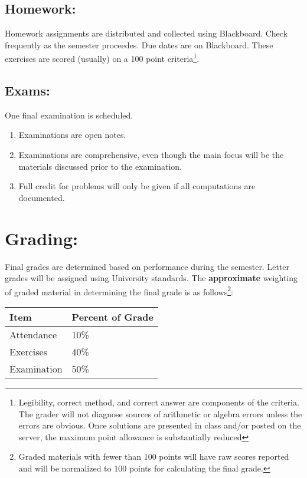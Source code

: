 \documentclass[12pt]{article}
\begin{document}
\subsection*{Homework:} 
Homework assignments are distributed and collected using Blackboard.  Check frequently as the semester proceedes.  Due dates are on Blackboard.  
These exercises are scored (usually) on a 100 point criteria\footnote{Legibility, correct method, and correct answer are components of the criteria.   
The grader will not diagnose sources of arithmetic or algebra errors unless the errors are obvious.  
Once solutions are presented in class and/or posted on the server, the maximum point allowance is substantially reduced}.


\subsection*{Exams:} One final examination is scheduled.  
\begin{enumerate}
\item Examinations are open notes.
\item Examinations are comprehensive, even though the main focus will be the materials discussed prior to the examination.
\item Full credit for problems will only be given if all computations are documented.
\end{enumerate}

\section*{Grading:} Final grades are determined based on performance during the semester.  Letter grades will be assigned using University standards.  The \textbf{approximate} weighting of graded material in determining the final grade is as follows\footnote{Graded materials with fewer than 100 points will have raw scores reported and will be normalized to 100 points for calculating the final grade.}:
\begin{table}[h!]
   \centering
   \begin{tabular}{l l}
Item & Percent of Grade \\
\hline
\hline
Attendance & 10\% \\
Exercises & 40\% \\
Examination & 50\% \\
\hline
\end{tabular}
\end{table}
\end{document}
